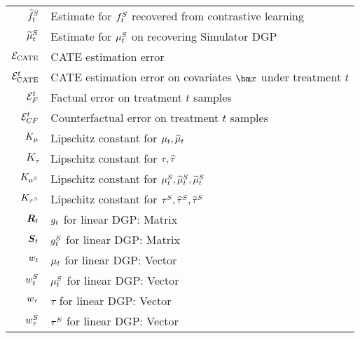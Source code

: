 \begin{table}[H]
{\begin{tabular}{r|l}
        $\SInvTilde_t$ & Estimate for $\SInv_t$ recovered from contrastive learning \\%
        $\synmuTilde_t$ & Estimate for $\synmu_t$ on recovering Simulator DGP\\ %
        \hline
        $\ErrITE$ & CATE estimation error\\
        $\ErrITE^t$ & CATE estimation error on covariates $\xb$ under treatment $t$\\
        $\ErrF^t$ & Factual error on treatment $t$ samples\\
        $\ErrCF^t$ & Counterfactual error on treatment $t$ samples\\
        \hline
        $K_{\realmu}$ & Lipschitz constant for $\realmu_t, \realmuhat_t$\\
        $K_{\tau}$ & Lipschitz constant for $\tau, \tauhat$\\
        $K_{\synmu}$ & Lipschitz constant for $\synmu_t, \synmuhat_t, \synmuTilde_t$\\
        $K_{\syntau}$ & Lipschitz constant for $\syntau, \syntauhat, \syntauTilde$\\
         \hline   
       $\mat{R}_t$ & $\R_t$ for linear DGP: Matrix\\
       $\mat{S}_t$ & $\S_t$ for linear DGP: Matrix\\
       $\wbeta{t}$ & $\realmu_t$ for linear DGP: Vector\\
       $\wbetas{t}$ & $\synmu_t$ for linear DGP: Vector\\
       $\realwb_\tau$ & $\tau$ for linear DGP: Vector\\
       $\realwb_\tau^S$ & $\syntau$ for linear DGP: Vector\\ 
         \hline
    \end{tabular}}
    \label{tab:symbols}
\end{table}
